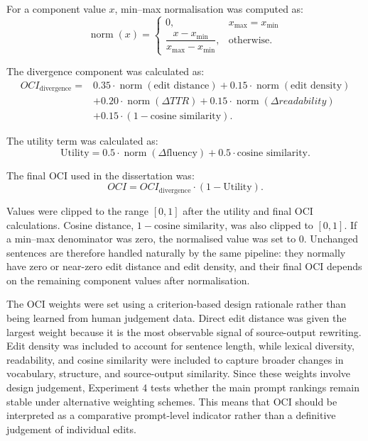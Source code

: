For a component value $x$, min--max normalisation was computed as:
\begin{equation}
    \operatorname{norm}(x)=
    \begin{cases}
    0, & x_{\max}=x_{\min} \\
    \dfrac{x-x_{\min}}{x_{\max}-x_{\min}}, & \text{otherwise.}
    \end{cases}
\end{equation}

The divergence component was calculated as:
\begin{align}
OCI_{\text{divergence}} ={}& 0.35 \cdot \operatorname{norm}(\text{edit distance})
+ 0.15 \cdot \operatorname{norm}(\text{edit density}) \\
&+ 0.20 \cdot \operatorname{norm}(\Delta TTR)
+ 0.15 \cdot \operatorname{norm}(\Delta readability) \\
&+ 0.15 \cdot (1 - \text{cosine similarity}).
\end{align}

The utility term was calculated as:
\begin{equation}
\text{Utility} = 0.5 \cdot \operatorname{norm}(\Delta \text{fluency}) + 0.5 \cdot \text{cosine similarity}.
\end{equation}

The final OCI used in the dissertation was:
\begin{equation}
OCI = OCI_{\text{divergence}} \cdot (1 - \text{Utility}).
\end{equation}

Values were clipped to the range $[0,1]$ after the utility and final OCI calculations. Cosine distance, $1 - \text{cosine similarity}$, was also clipped to $[0,1]$. If a min--max denominator was zero, the normalised value was set to 0. Unchanged sentences are therefore handled naturally by the same pipeline: they normally have zero or near-zero edit distance and edit density, and their final OCI depends on the remaining component values after normalisation.

The OCI weights were set using a criterion-based design rationale rather than being learned from human judgement data. Direct edit distance was given the largest weight because it is the most observable signal of source-output rewriting. Edit density was included to account for sentence length, while lexical diversity, readability, and cosine similarity were included to capture broader changes in vocabulary, structure, and source-output similarity. Since these weights involve design judgement, Experiment 4 tests whether the main prompt rankings remain stable under alternative weighting schemes. This means that OCI should be interpreted as a comparative prompt-level indicator rather than a definitive judgement of individual edits.

